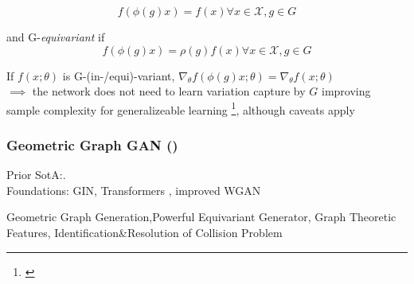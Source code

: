 \documentclass[./presentation.tex]{subfiles}
\begin{document}
\begin{frame}[label=working,t]
{    \begin{equation}
  f(\phi(g)x)=f(x)\forall x \in \mathcal{X},g\in G\nonumber
    \end{equation}

  and G-\emph{equivariant} if
  \begin{equation}
  f(\phi(g)x)=\rho(g)f(x) \forall x \in\mathcal{X},g\in G\nonumber
  \end{equation}

  If $f(x;\theta)$ is G-(in-/equi)-variant, $\nabla_\theta f(\phi(g)x;\theta)=\nabla_\theta f(x;\theta)$\\

  $\implies$ the network does not need to learn variation capture by $G$ improving sample complexity for generalizeable learning
  \footnote[frame]{\cite{elesedyProvablyStrictGeneralisation2021b}}, although caveats apply
}
\end{frame}
\begin{frame}[t]
  \frametitle{Geometric Graph GAN (\cite{krawczukGGGANGeometricGraph2020})}
  \vspace{-1cm}
  \begin{priorart}
   Prior SotA:\cite{yangConditionalStructureGeneration2019e,decaoMolGANImplicitGenerative2022b}.\\
   Foundations: GIN\cite{xuHowPowerfulAre2019e}, Transformers \cite{vaswaniAttentionAllYou2017c}, improved WGAN \cite{gulrajaniImprovedTrainingWasserstein2017d}
  \end{priorart}
  \begin{contributions}
    Geometric Graph Generation,Powerful Equivariant Generator, Graph Theoretic Features, Identification\&Resolution of Collision Problem
  \end{contributions}
\end{frame}
\end{document}
